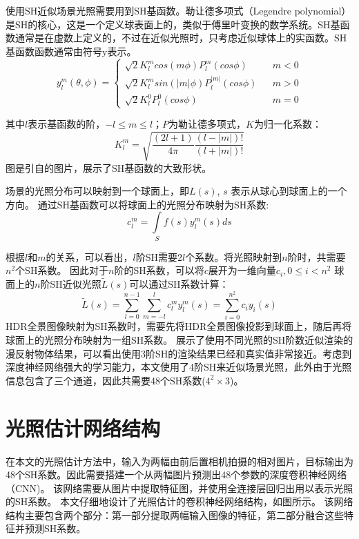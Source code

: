 使用SH近似场景光照需要用到SH基函数。勒让德多项式（Legendre polynomial）是SH的核心，这是一个定义球表面上的，类似于傅里叶变换的数学系统。SH基函数通常是在虚数上定义的，不过在近似光照时，只考虑近似球体上的实函数。SH基函数函数通常由符号y表示。
\begin{equation}
y^m_l(\theta, \phi)=\left\{
    \begin{array}{lcl}
        \sqrt{2}K^m_lcos(m\phi)P^m_l(cos\phi) & & {m<0}\\
        \sqrt{2}K^m_lsin(|m|\phi)P^|m|_l(cos\phi) & & {m>0}\\
        \sqrt{2}K^0_lP^0_l(cos\phi) & & {m=0}
    \end{array} \right. 
\end{equation}

其中$l$表示基函数的阶，$-l \leq m \leq l$；$P$为勒让德多项式，$K$为归一化系数：
\begin{equation}
    K^m_l=\sqrt{\frac{(2l+1)}{4\pi}\frac{(l-|m|)!}{(l+|m|)!}}
\end{equation}
图是引自\cite{green2003spherical}的图片，展示了SH基函数的大致形状。

场景的光照分布可以映射到一个球面上，即$L(s)$, $s$ 表示从球心到球面上的一个方向。
通过SH基函数可以将球面上的光照分布映射为SH系数:
\begin{equation}
    c^m_l = \int\limits_{S}f(s)y^m_l(s)ds
\end{equation}

根据$l$和$m$的关系，可以看出，$l$阶SH需要$2l$个系数。将光照映射到$n$阶时，共需要$n^2$个SH系数。
因此对于$n$阶的SH系数，可以将$c$展开为一维向量$c_i, 0 \leq i < n^2$
球面上的$n$阶SH近似光照$\tilde{L}(s)$可以通过SH系数计算：
\begin{equation}
    \tilde{L}(s)=\sum_{l=0}^{n-1}\sum_{m=-l}^{l}c^m_ly^m_l(s)=\sum_{i=0}^{n^2}c_iy_i(s)
\end{equation}
HDR全景图像映射为SH系数时，需要先将HDR全景图像投影到球面上，随后再将球面上的光照分布映射为一组SH系数。
展示了使用不同光照的SH阶数近似渲染的漫反射物体结果，可以看出使用3阶SH的渲染结果已经和真实值非常接近。考虑到深度神经网络强大的学习能力，本文使用了4阶SH来近似场景光照，此外由于光照信息包含了三个通道，因此共需要48个SH系数($4^2\times3$)。
\section{光照估计网络结构}
在本文的光照估计方法中，输入为两幅由前后置相机拍摄的相对图片，目标输出为48个SH系数。因此需要搭建一个从两幅图片预测出48个参数的深度卷积神经网络（CNN)。
该网络需要从图片中提取特征图，并使用全连接层回归出用以表示光照的SH系数。
本文仔细地设计了光照估计的卷积神经网络结构，如图所示。
该网络结构主要包含两个部分：第一部分提取两幅输入图像的特征，第二部分融合这些特征并预测SH系数。 

